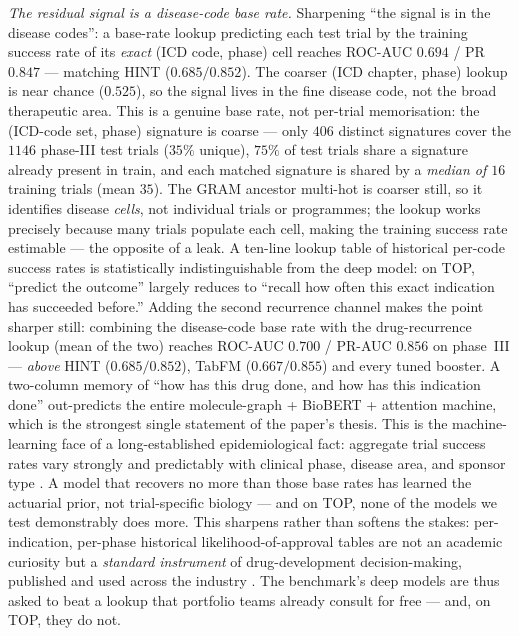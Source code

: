 \documentclass[a4paper,fleqn]{cas-sc}
\begin{document}
\emph{The residual signal is a disease-code base rate.} Sharpening ``the signal is in the
disease codes'': a base-rate lookup predicting each test trial by the training success rate of
its \emph{exact} (ICD code, phase) cell reaches ROC-AUC $0.694$ / PR $0.847$ --- matching HINT
($0.685/0.852$). The coarser (ICD chapter, phase) lookup is near chance ($0.525$), so the
signal lives in the fine disease code, not the broad therapeutic area. This is a genuine
base rate, not per-trial memorisation: the (ICD-code set, phase) signature is coarse --- only
$406$ distinct signatures cover the $1146$ phase-III test trials ($35\%$ unique), $75\%$ of test
trials share a signature already present in train, and each matched signature is shared by a
\emph{median of $16$} training trials (mean $35$). The GRAM ancestor multi-hot is coarser still,
so it identifies disease \emph{cells}, not individual trials or programmes; the lookup works
precisely because many trials populate each cell, making the training success rate estimable ---
the opposite of a leak. A ten-line lookup table
of historical per-code success rates is statistically indistinguishable from the deep model:
on TOP, ``predict the outcome'' largely reduces to ``recall how often this exact indication has
succeeded before.'' Adding the second recurrence channel makes the point sharper still:
combining the disease-code base rate with the drug-recurrence lookup (mean of the two) reaches
ROC-AUC $\mathbf{0.700}$ / PR-AUC $0.856$ on phase~III --- \emph{above} HINT ($0.685/0.852$),
TabFM ($0.667/0.855$) and every tuned booster. A two-column memory of ``how has this drug done,
and how has this indication done'' out-predicts the entire molecule-graph + BioBERT + attention
machine, which is the strongest single statement of the paper's thesis. This is the
machine-learning face of a long-established epidemiological fact: aggregate trial success rates
vary strongly and predictably with clinical phase, disease area, and sponsor type
\citep{hay2014clinical,wong2019estimation}. A model that recovers no more than those base rates
has learned the actuarial prior, not trial-specific biology --- and on TOP, none of the models
we test demonstrably does more. This sharpens rather than softens the stakes: per-indication,
per-phase historical likelihood-of-approval tables are not an academic curiosity but a
\emph{standard instrument} of drug-development decision-making, published and used across the
industry \citep{hay2014clinical,wong2019estimation}. The benchmark's deep models are thus asked
to beat a lookup that portfolio teams already consult for free --- and, on TOP, they do not.
\end{document}
